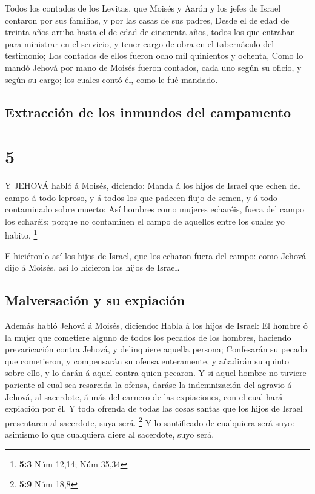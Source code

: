  Todos los contados de los Levitas, que Moisés y Aarón y
los jefes de Israel contaron por sus familias, y por las casas de sus
padres,  Desde el de edad de treinta años arriba hasta el
de edad de cincuenta años, todos los que entraban para ministrar en el
servicio, y tener cargo de obra en el tabernáculo del testimonio;
 Los contados de ellos fueron ocho mil quinientos y
ochenta,  Como lo mandó Jehová por mano de Moisés fueron
contados, cada uno según su oficio, y según su cargo; los cuales contó
él, como le fué mandado.

\hypertarget{extracciuxf3n-de-los-inmundos-del-campamento}{%
\subsection{Extracción de los inmundos del
campamento}\label{extracciuxf3n-de-los-inmundos-del-campamento}}

\hypertarget{section-4}{%
\section{5}\label{section-4}}

 Y JEHOVÁ habló á Moisés, diciendo:  Manda á los
hijos de Israel que echen del campo á todo leproso, y á todos los que
padecen flujo de semen, y á todo contaminado sobre muerto: 
Así hombres como mujeres echaréis, fuera del campo los echaréis; porque
no contaminen el campo de aquellos entre los cuales yo habito.
\footnote{\textbf{5:3} Núm 12,14; Núm 35,34}

 E hiciéronlo así los hijos de Israel, que los echaron fuera
del campo: como Jehová dijo á Moisés, así lo hicieron los hijos de
Israel.

\hypertarget{malversaciuxf3n-y-su-expiaciuxf3n}{%
\subsection{Malversación y su
expiación}\label{malversaciuxf3n-y-su-expiaciuxf3n}}

 Además habló Jehová á Moisés, diciendo:  Habla
á los hijos de Israel: El hombre ó la mujer que cometiere alguno de
todos los pecados de los hombres, haciendo prevaricación contra Jehová,
y delinquiere aquella persona;  Confesarán su pecado que
cometieron, y compensarán su ofensa enteramente, y añadirán su quinto
sobre ello, y lo darán á aquel contra quien pecaron.  Y si
aquel hombre no tuviere pariente al cual sea resarcida la ofensa, daráse
la indemnización del agravio á Jehová, al sacerdote, á más del carnero
de las expiaciones, con el cual hará expiación por él.  Y
toda ofrenda de todas las cosas santas que los hijos de Israel
presentaren al sacerdote, suya será. \footnote{\textbf{5:9} Núm 18,8}
 Y lo santificado de cualquiera será suyo: asimismo lo que
cualquiera diere al sacerdote, suyo será.

